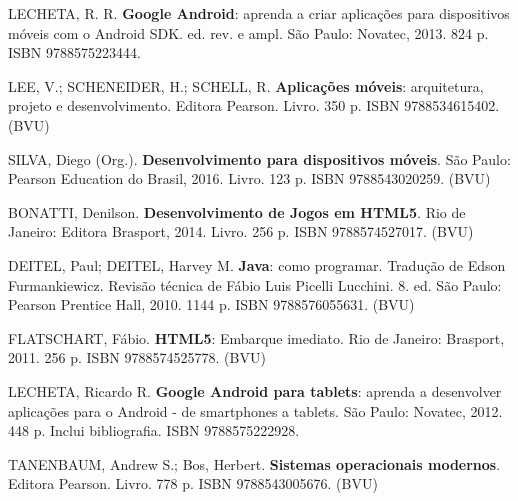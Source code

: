 \begin{pud}
	\begin{bibbasica}
			
        \item LECHETA, R. R. \textbf{Google Android}: aprenda a criar aplicações para dispositivos móveis com o Android SDK.  ed. rev. e ampl. São Paulo: Novatec, 2013. 824 p. ISBN 9788575223444. 
 		\item LEE, V.; SCHENEIDER, H.; SCHELL, R. \textbf{Aplicações móveis}: arquitetura, projeto e desenvolvimento. Editora Pearson. Livro. 350 p. ISBN 9788534615402. (BVU)
		\item SILVA, Diego (Org.). \textbf{Desenvolvimento para dispositivos móveis}.  São Paulo: Pearson Education do Brasil, 2016.  Livro. 123 p. ISBN 9788543020259. (BVU)
		
	\end{bibbasica}
	
	\begin{bibcomplementar}
    
    	\item  BONATTI, Denilson. \textbf{Desenvolvimento de Jogos em HTML5}. Rio de Janeiro: Editora Brasport, 2014. Livro. 256 p. ISBN 9788574527017. (BVU)
 		\item DEITEL, Paul; DEITEL, Harvey M. \textbf{Java}: como programar. Tradução de Edson Furmankiewicz. Revisão técnica de Fábio Luis Picelli Lucchini. 8. ed. São Paulo: Pearson Prentice Hall, 2010. 1144 p. ISBN 9788576055631. (BVU) 
		\item FLATSCHART, Fábio. \textbf{HTML5}: Embarque imediato. Rio de Janeiro: Brasport, 2011.  256 p. ISBN 9788574525778. (BVU)
		\item LECHETA, Ricardo R. \textbf{Google Android para tablets}: aprenda a desenvolver aplicações para o Android - de smartphones a tablets. São Paulo: Novatec, 2012. 448 p. Inclui bibliografia. ISBN 9788575222928.
		
		\item TANENBAUM, Andrew S.; Bos, Herbert. \textbf{Sistemas operacionais modernos}. Editora Pearson. Livro. 778 p. ISBN 9788543005676. (BVU)
		
	\end{bibcomplementar}
	
	
    	
	
\end{pud}



